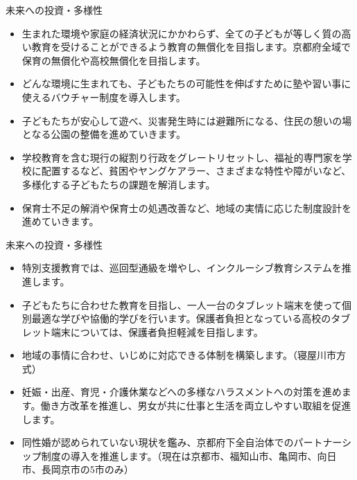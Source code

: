 \documentclass[dvipdfmx]{beamer}
\begin{document}
    \begin{frame}{未来への投資・多様性}{}
        \begin{small}
            \begin{itemize}
                \setlength{\itemsep}{2mm}
                \item 生まれた環境や家庭の経済状況にかかわらず、全ての子どもが等しく質の高い教育を受けることができるよう教育の無償化を目指します。京都府全域で保育の無償化や高校無償化を目指します。
                \item どんな環境に生まれても、子どもたちの可能性を伸ばすために塾や習い事に使えるバウチャー制度を導入します。
                \item 子どもたちが安心して遊べ、災害発生時には避難所になる、住民の憩いの場となる公園の整備を進めていきます。
                \item 学校教育を含む現行の縦割り行政をグレートリセットし、福祉的専門家を学校に配置するなど、貧困やヤングケアラー、さまざまな特性や障がいなど、多様化する子どもたちの課題を解消します。
                \item 保育士不足の解消や保育士の処遇改善など、地域の実情に応じた制度設計を進めていきます。
            \end{itemize}
        \end{small}
    \end{frame}

    \begin{frame}{未来への投資・多様性}{}
        \begin{small}
            \begin{itemize}
                \setlength{\itemsep}{1.5mm}
                \item 特別支援教育では、巡回型通級を増やし、インクルーシブ教育システムを推進します。
                \item 子どもたちに合わせた教育を目指し、一人一台のタブレット端末を使って個別最適な学びや協働的学びを行います。保護者負担となっている高校のタブレット端末については、保護者負担軽減を目指します。
                \item 地域の事情に合わせ、いじめに対応できる体制を構築します。（寝屋川市方式）
                \item 妊娠・出産、育児・介護休業などへの多様なハラスメントへの対策を進めます。働き方改革を推進し、男女が共に仕事と生活を両立しやすい取組を促進します。
                \item 同性婚が認められていない現状を鑑み、京都府下全自治体でのパートナーシップ制度の導入を推進します。（現在は京都市、福知山市、亀岡市、向日市、長岡京市の5市のみ）
            \end{itemize}
        \end{small}
    \end{frame}
\end{document}
